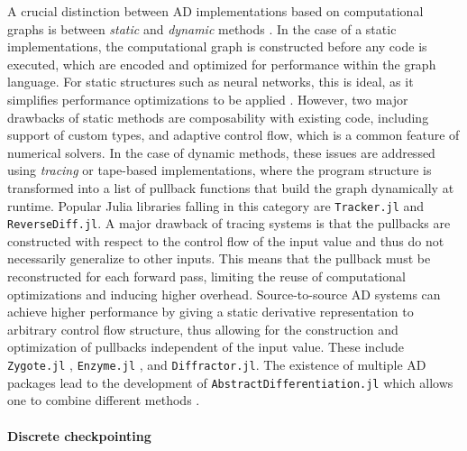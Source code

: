 A crucial distinction between AD implementations based on computational graphs is between \textit{static} and \textit{dynamic} methods \cite{Baydin_Pearlmutter_Radul_Siskind_2015}. 
In the case of a static implementations, the computational graph is constructed before any code is executed, which are encoded and optimized for performance within the graph language. 
For static structures such as neural networks, this is ideal, as it simplifies performance optimizations to be applied \cite{abadi-tensorflow}. 
However, two major drawbacks of static methods are composability with existing code, including support of custom types, and adaptive control flow, which is a common feature of numerical solvers. 
In the case of dynamic methods, these issues are addressed using \textit{tracing} or tape-based implementations, where the program structure is transformed into a list of pullback functions that build the graph dynamically at runtime. 
Popular Julia libraries falling in this category are \texttt{Tracker.jl} and \texttt{ReverseDiff.jl}. 
A major drawback of tracing systems is that the pullbacks are constructed with respect to the control flow of the input value and thus do not necessarily generalize to other inputs. 
This means that the pullback must be reconstructed for each forward pass, limiting the reuse of computational optimizations and inducing higher overhead. 
Source-to-source AD systems can achieve higher performance by giving a static derivative representation to arbitrary control flow structure, thus allowing for the construction and optimization of pullbacks independent of the input value. 
These include \texttt{Zygote.jl} \cite{Innes_Zygote}, \texttt{Enzyme.jl} \cite{moses_Enzyme, Moses.2021}, and \texttt{Diffractor.jl}.
The existence of multiple AD packages lead to the development of \texttt{AbstractDifferentiation.jl} which allows one to combine different methods \cite{Schäfer_Tarek_White_Rackauckas_2021}. 


\paragraph{Discrete checkpointing}
\label{section:checkpointing}

